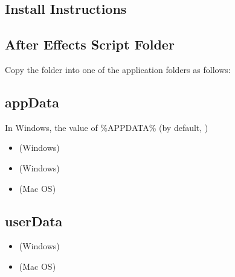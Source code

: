 \documentclass[a4paper,11pt,openany,oneside,english]{sphinxmanual}
\begin{document}
\subsection{Install Instructions}
\label{\detokenize{getting_started/install:install-instructions}}

\subsection{After Effects Script Folder}
\label{\detokenize{getting_started/install:after-effects-script-folder}}
Copy the  folder into one of the application folders as follows:


\subsection{appData}
\label{\detokenize{getting_started/install:appdata}}
In Windows, the value of \%APPDATA\% (by default, )
\begin{itemize}
\item {} 
(Windows) 

\item {} 
(Windows) 

\item {} 
(Mac OS) 

\end{itemize}


\subsection{userData}
\label{\detokenize{getting_started/install:userdata}}\begin{itemize}
\item {} 
(Windows) 

\item {} 
(Mac OS) 

\end{itemize}
\end{document}
